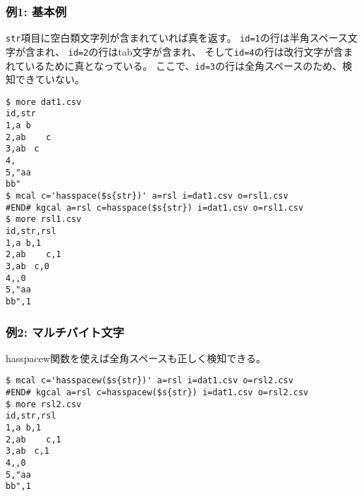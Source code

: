 \subsubsection*{例1: 基本例}

\verb|str|項目に空白類文字列が含まれていれば真を返す。
\verb|id=1|の行は半角スペース文字が含まれ、
\verb|id=2|の行はtab文字が含まれ、
そして\verb|id=4|の行は改行文字が含まれているために真となっている。
ここで、\verb|id=3|の行は全角スペースのため、検知できていない。


\begin{Verbatim}[baselinestretch=0.7,frame=single]
$ more dat1.csv
id,str
1,a b
2,ab	c
3,ab　c
4,
5,"aa
bb"
$ mcal c='hasspace($s{str})' a=rsl i=dat1.csv o=rsl1.csv
#END# kgcal a=rsl c=hasspace($s{str}) i=dat1.csv o=rsl1.csv
$ more rsl1.csv
id,str,rsl
1,a b,1
2,ab	c,1
3,ab　c,0
4,,0
5,"aa
bb",1
\end{Verbatim}
\subsubsection*{例2: マルチバイト文字}

hasspacew関数を使えば全角スペースも正しく検知できる。


\begin{Verbatim}[baselinestretch=0.7,frame=single]
$ mcal c='hasspacew($s{str})' a=rsl i=dat1.csv o=rsl2.csv
#END# kgcal a=rsl c=hasspacew($s{str}) i=dat1.csv o=rsl2.csv
$ more rsl2.csv
id,str,rsl
1,a b,1
2,ab	c,1
3,ab　c,1
4,,0
5,"aa
bb",1
\end{Verbatim}
